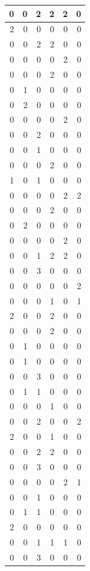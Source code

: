 \documentclass[
  12pt,
]{krantz}
\begin{document}
\begin{tabular}{r|r|r|r|r|r}
\hline
0 & 0 & 2 & 2 & 2 & 0\\
\hline
2 & 0 & 0 & 0 & 0 & 0\\
\hline
0 & 0 & 2 & 2 & 0 & 0\\
\hline
0 & 0 & 0 & 0 & 2 & 0\\
\hline
0 & 0 & 0 & 2 & 0 & 0\\
\hline
0 & 1 & 0 & 0 & 0 & 0\\
\hline
0 & 2 & 0 & 0 & 0 & 0\\
\hline
0 & 0 & 0 & 0 & 2 & 0\\
\hline
0 & 0 & 2 & 0 & 0 & 0\\
\hline
0 & 0 & 1 & 0 & 0 & 0\\
\hline
0 & 0 & 0 & 2 & 0 & 0\\
\hline
1 & 0 & 1 & 0 & 0 & 0\\
\hline
0 & 0 & 0 & 0 & 2 & 2\\
\hline
0 & 0 & 0 & 2 & 0 & 0\\
\hline
0 & 2 & 0 & 0 & 0 & 0\\
\hline
0 & 0 & 0 & 0 & 2 & 0\\
\hline
0 & 0 & 1 & 2 & 2 & 0\\
\hline
0 & 0 & 3 & 0 & 0 & 0\\
\hline
0 & 0 & 0 & 0 & 0 & 2\\
\hline
0 & 0 & 0 & 1 & 0 & 1\\
\hline
2 & 0 & 0 & 2 & 0 & 0\\
\hline
0 & 0 & 0 & 2 & 0 & 0\\
\hline
0 & 1 & 0 & 0 & 0 & 0\\
\hline
0 & 1 & 0 & 0 & 0 & 0\\
\hline
0 & 0 & 3 & 0 & 0 & 0\\
\hline
0 & 1 & 1 & 0 & 0 & 0\\
\hline
0 & 0 & 0 & 1 & 0 & 0\\
\hline
0 & 0 & 2 & 0 & 0 & 2\\
\hline
2 & 0 & 0 & 1 & 0 & 0\\
\hline
0 & 0 & 2 & 2 & 0 & 0\\
\hline
0 & 0 & 3 & 0 & 0 & 0\\
\hline
0 & 0 & 0 & 0 & 2 & 1\\
\hline
0 & 0 & 1 & 0 & 0 & 0\\
\hline
0 & 1 & 1 & 0 & 0 & 0\\
\hline
2 & 0 & 0 & 0 & 0 & 0\\
\hline
0 & 0 & 1 & 1 & 1 & 0\\
\hline
0 & 0 & 3 & 0 & 0 & 0\\

\end{tabular}
\end{document}
